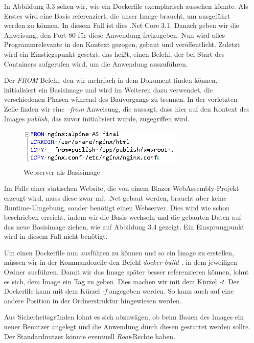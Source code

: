 \documentclass[12pt,a4paper]{scrartcl}
\begin{document}
In Abbildung 3.3 sehen wir, wie ein Dockerfile exemplarisch aussehen könnte. Als Erstes wird eine Basis referenziert, die unser Image braucht, um ausgeführt werden zu können. In diesem Fall ist dies .Net Core 3.1. Danach geben wir die Anweisung, den Port 80 für diese Anwendung freizugeben. Nun wird alles Programmrelevante in den Kontext gezogen, gebaut und veröffentlicht. Zuletzt wird ein Einstiegspunkt gesetzt, das heißt, einen Befehl, der bei Start des Containers aufgerufen wird, um die Anwendung auszuführen. 

Der \emph{FROM} Befehl, den wir mehrfach in dem Dokument finden können, initialisiert ein Basisimage und wird im Weiteren dazu verwendet, die verschiedenen Phasen während des Bauvorgangs zu trennen. In der vorletzten Zeile finden wir eine \emph{--from} Anweisung, die aussagt, dass hier auf den Kontext des Images \emph{publish}, das zuvor initialisiert wurde, zugegriffen wird.

\begin{figure}[h!]
	\centering
	\includegraphics[scale=1]{DockerfileBlazor.png}
	\caption[Screenshot]{Webserver als Basisimage}
\end{figure}

Im Falle einer statischen Website, die von einem Blazor-WebAssembly-Projekt erzeugt wird, muss diese zwar mit .Net gebaut werden, braucht aber keine Runtime-Umgebung, sonder benötigt einen Webserver.
Dies wird wie schon beschrieben erreicht, indem wir die Basis wechseln und die gebauten Daten auf das neue Basisimage ziehen, wie auf Abbildung 3.4 gezeigt. Ein Einsprungpunkt wird in diesem Fall nicht benötigt.

Um einen Dockerfile nun ausführen zu können und so ein Image zu erstellen, müssen wir in der Kommandozeile den Befehl \emph{docker build .} in dem jeweiligen Ordner ausführen. Damit wir das Image später besser referenzieren können, lohnt es sich, dem Image ein Tag zu geben. Dies machen wir mit dem Kürzel \emph{-t}. Der Dockerfile kann mit dem Kürzel \emph{-f} angegeben werden. So kann auch auf eine andere Position in der Ordnerstruktur hingewiesen werden.

Aus Sicherheitsgründen lohnt es sich abzuwägen, ob beim Bauen des Images ein neuer Benutzer angelegt und die Anwendung durch diesen gestartet werden sollte. Der Standardnutzer könnte eventuell \emph{Root}-Rechte haben.
\end{document}
